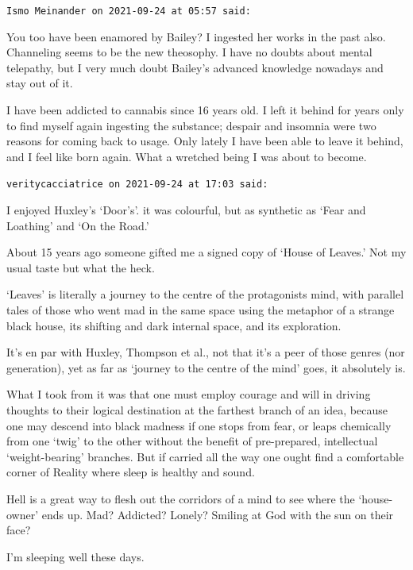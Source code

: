 \begin{footnotesize}\begin{sffamily}



\texttt{Ismo Meinander on 2021-09-24 at 05:57 said: }

You too have been enamored by Bailey? I ingested her works in the past also. Channeling seems to be the new theosophy. I have no doubts about mental telepathy, but I very much doubt Bailey's advanced knowledge nowadays and stay out of it.

I have been addicted to cannabis since 16 years old. I left it behind for years only to find myself again ingesting the substance; despair and insomnia were two reasons for coming back to usage. Only lately I have been able to leave it behind, and I feel like born again. What a wretched being I was about to become.


\hfill

\texttt{veritycacciatrice on 2021-09-24 at 17:03 said: }

I enjoyed Huxley's `Door's'. it was colourful, but as synthetic as `Fear and Loathing' and `On the Road.'

About 15 years ago someone gifted me a signed copy of `House of Leaves.' Not my usual taste but what the heck.

`Leaves' is literally a journey to the centre of the protagonists mind, with parallel tales of those who went mad in the same space using the metaphor of a strange black house, its shifting and dark internal space, and its exploration.

It's en par with Huxley, Thompson et al., not that it's a peer of those genres (nor generation), yet as far as `journey to the centre of the mind' goes, it absolutely is.

What I took from it was that one must employ courage and will in driving thoughts to their logical destination at the farthest branch of an idea, because one may descend into black madness if one stops from fear, or leaps chemically from one `twig' to the other without the benefit of pre-prepared, intellectual `weight-bearing' branches. But if carried all the way one ought find a comfortable corner of Reality where sleep is healthy and sound.

Hell is a great way to flesh out the corridors of a mind to see where the `house-owner' ends up. Mad? Addicted? Lonely? Smiling at God with the sun on their face?

I'm sleeping well these days.


\end{sffamily}\end{footnotesize}
